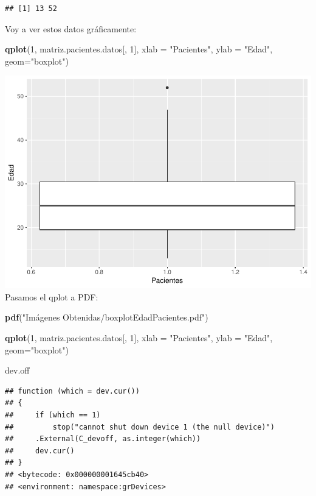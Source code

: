 \documentclass[]{article}
\newenvironment{Shaded}{\begin{snugshade}}{\end{snugshade}}
\newcommand{\DataTypeTok}[1]{\textcolor[rgb]{0.13,0.29,0.53}{#1}}
\newcommand{\DecValTok}[1]{\textcolor[rgb]{0.00,0.00,0.81}{#1}}
\newcommand{\KeywordTok}[1]{\textcolor[rgb]{0.13,0.29,0.53}{\textbf{#1}}}
\newcommand{\NormalTok}[1]{#1}
\newcommand{\StringTok}[1]{\textcolor[rgb]{0.31,0.60,0.02}{#1}}
\begin{document}
\begin{verbatim}
## [1] 13 52
\end{verbatim}

Voy a ver estos datos gráficamente:

\begin{Shaded}
\begin{Highlighting}[]
\KeywordTok{qplot}\NormalTok{(}\DecValTok{1}\NormalTok{, matriz.pacientes.datos[, }\DecValTok{1}\NormalTok{], }\DataTypeTok{xlab =} \StringTok{"Pacientes"}\NormalTok{, }\DataTypeTok{ylab =} \StringTok{"Edad"}\NormalTok{, }\DataTypeTok{geom=}\StringTok{"boxplot"}\NormalTok{)}
\end{Highlighting}
\end{Shaded}

\includegraphics{codigo_files/figure-latex/grafico_estadistica_edad-1.pdf}
Pasamos el qplot a PDF:

\begin{Shaded}
\begin{Highlighting}[]
\KeywordTok{pdf}\NormalTok{(}\StringTok{"Imágenes Obtenidas/boxplotEdadPacientes.pdf"}\NormalTok{)}

\KeywordTok{qplot}\NormalTok{(}\DecValTok{1}\NormalTok{, matriz.pacientes.datos[, }\DecValTok{1}\NormalTok{], }\DataTypeTok{xlab =} \StringTok{"Pacientes"}\NormalTok{, }\DataTypeTok{ylab =} \StringTok{"Edad"}\NormalTok{, }\DataTypeTok{geom=}\StringTok{"boxplot"}\NormalTok{)}

\NormalTok{dev.off}
\end{Highlighting}
\end{Shaded}

\begin{verbatim}
## function (which = dev.cur()) 
## {
##     if (which == 1) 
##         stop("cannot shut down device 1 (the null device)")
##     .External(C_devoff, as.integer(which))
##     dev.cur()
## }
## <bytecode: 0x000000001645cb40>
## <environment: namespace:grDevices>
\end{verbatim}
\end{document}
